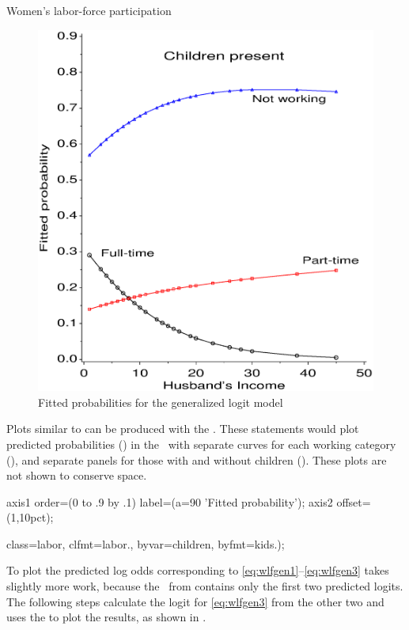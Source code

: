 \begin{Example}[wlfpart2]{Women's labor-force participation}
\begin{figure}[htb]
\begin{minipage}[b]{.49\linewidth}
 \end{minipage}%
 \hfill
 \begin{minipage}[b]{.49\linewidth}
  \centering
  \includegraphics[width=1\linewidth]{ch6/fig/wlfpart32}
 \end{minipage}
  \caption[Women's Labor Force Participation, fitted probabilities]{Fitted probabilities for the generalized logit model}\label{fig:wlfpart3}
\end{figure}
Plots similar to  can be produced with the
.  These statements would plot predicted probabilities
() in the  \Dset\ with separate
curves for each working category (),
and separate panels for those with and without children
().  These plots are not shown to conserve space.
\begin{listing}
axis1 order=(0 to .9 by .1) label=(a=90 'Fitted probability');
axis2 offset=(1,10pct);

   class=labor, clfmt=labor.,
   byvar=children, byfmt=kids.);
\end{listing}
To plot the predicted log odds corresponding to \eqref{eq:wlfgen1}--\eqref{eq:wlfgen3} takes slightly more work, because the
\ODS\ from  contains only the first two predicted logits.
The following steps calculate the logit for \eqref{eq:wlfgen3} from the other
two and uses the  to plot the results, as shown in
.


\end{Example}
